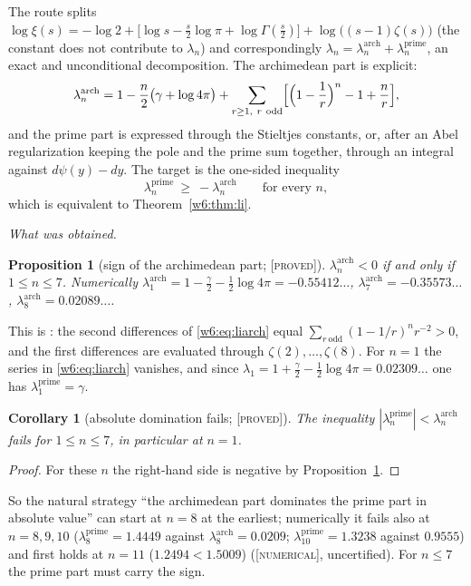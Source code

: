 \documentclass[11pt]{amsart}
\newtheorem{proposition}[theorem]{Proposition}
\newtheorem{corollary}[theorem]{Corollary}
\theoremstyle{definition}
\theoremstyle{remark}
\numberwithin{equation}{section}
\newcommand{\stag}[1]{\textsc{[#1]}}
\newcommand{\PROVED}{\stag{proved}}
\newcommand{\NUM}{\stag{numerical}}
\newcommand{\entry}[1]{\par\smallskip\noindent\textit{#1.}\enspace}
\begin{document}
The route splits $\log\xi(s)=-\log2+\bigl[\log s-\frac s2\log\pi+\log\Gamma(\frac s2)\bigr]+\log\bigl((s-1)\zeta(s)\bigr)$
(the constant does not contribute to $\lambda_n$) and correspondingly $\lambda_n=\lambda_n^{\mathrm{arch}}+\lambda_n^{\mathrm{prime}}$, an exact and
unconditional decomposition. The archimedean part is explicit:
\begin{equation}\label{w6:eq:liarch}
\lambda_n^{\mathrm{arch}}=1-\frac n2\bigl(\gamma+\log4\pi\bigr)
+\sum_{r\ge1,\ r\ \mathrm{odd}}\Bigl[\Bigl(1-\frac1r\Bigr)^{n}-1+\frac nr\Bigr],
\end{equation}
and the prime part is expressed through the Stieltjes constants, or, after an Abel regularization
keeping the pole and the prime sum together, through an integral against $d\psi(y)-dy$. The
target is the one-sided inequality
\begin{equation}\label{w6:eq:lionesided}
\lambda_n^{\mathrm{prime}}\ \ge\ -\lambda_n^{\mathrm{arch}}\qquad\text{for every }n,
\end{equation}
which is equivalent to Theorem~\ref{w6:thm:li}.

\entry{What was obtained}

\begin{proposition}[sign of the archimedean part; \PROVED]\label{w6:prop:liarch}
$\lambda_n^{\mathrm{arch}}<0$ if and only if $1\le n\le7$. Numerically
$\lambda_1^{\mathrm{arch}}=1-\frac\gamma2-\frac12\log4\pi=-0.55412\ldots$,
$\lambda_7^{\mathrm{arch}}=-0.35573\ldots$, $\lambda_8^{\mathrm{arch}}=0.02089\ldots$.
\end{proposition}
This is \cite[Lemma~9.121]{P36}: the second differences of \eqref{w6:eq:liarch} equal
$\sum_{r\ \mathrm{odd}}(1-1/r)^n r^{-2}>0$, and the first differences are evaluated through
$\zeta(2),\dots,\zeta(8)$. For $n=1$ the series in \eqref{w6:eq:liarch} vanishes, and since
$\lambda_1=1+\frac\gamma2-\frac12\log4\pi=0.02309\ldots$ one has $\lambda_1^{\mathrm{prime}}=\gamma$.

\begin{corollary}[absolute domination fails; \PROVED]\label{w6:cor:absdom}
The inequality $|\lambda_n^{\mathrm{prime}}|<\lambda_n^{\mathrm{arch}}$ fails for $1\le n\le7$, in
particular at $n=1$.
\end{corollary}
\begin{proof}
For these $n$ the right-hand side is negative by Proposition~\ref{w6:prop:liarch}.
\end{proof}
So the natural strategy ``the archimedean part dominates the prime part in absolute value'' can
start at $n=8$ at the earliest; numerically it fails also at $n=8,9,10$
($\lambda_8^{\mathrm{prime}}=1.4449$ against $\lambda_8^{\mathrm{arch}}=0.0209$;
$\lambda_{10}^{\mathrm{prime}}=1.3238$ against $0.9555$) and first holds at $n=11$
($1.2494<1.5009$) (\NUM, uncertified). For $n\le7$ the prime part must carry the sign.
\end{document}
